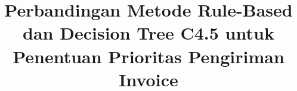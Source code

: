 \documentclass[conference]{IEEEtran}
\begin{document}
\title{Perbandingan Metode Rule-Based dan Decision Tree C4.5 untuk Penentuan Prioritas Pengiriman Invoice}

\author{
\and
{}
}

\maketitle










\end{document}
